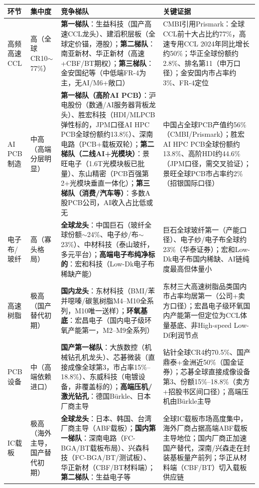 \begin{exhibitbox}[图表4-6：各环节竞争梯队与集中度]
\footnotesize
\begin{tabularx}{\textwidth}{L{2.0cm}L{1.5cm}X L{3.5cm}}
\toprule
\textbf{环节} & \textbf{集中度} & \textbf{竞争梯队} & \textbf{关键证据} \\
\midrule
高频高速CCL & 高（全球CR10$\sim$77\%） & \textbf{第一梯队}：生益科技（国产高速CCL龙头）、建滔积层板（全球定价锚，港股）；\textbf{第二梯队}：南亚新材、华正新材（高速+CBF/BT期权）；\textbf{第三梯队}：金安国纪等（中低端FR-4为主，无AI/M6+敞口） & CMBI引用Prismark：全球CCL前十大占比约77\%，高速专用CCL 2024年同比增长约50\%；华正全球份额约2.8\%、排名第11（申万口径）；金安国内市占率约3\%、FR-4定位 \\
\midrule
AI PCB制造 & 中高（高端分层明显） & \textbf{第一梯队（高阶AI PCB）}：沪电股份（数通/AI服务器背板龙头）、胜宏科技（HDI/MLPCB弹性标的，JPM口径AI HPC PCB全球份额约13.8\%）、深南电路（PCB+载板双轮）；\textbf{第二梯队（二线AI+光模块）}：景旺电子（1.6T光模块板已批量）、东山精密（PCB百强第2+光模块垂直一体化）；\textbf{第三梯队（消费/汽车等）}：多数A股PCB公司，AI收入占比低或无 & 中国占全球PCB产值约56\%（CMBI/Prismark）；胜宏AI HPC PCB全球份额约13.8\%、高阶HDI约44.6\%（JPM口径，需交叉验证）；景旺全球PCB市占率约2\%（招银国际口径） \\
\midrule
电子布/玻纤 & 高（寡头格局） & \textbf{全球龙头}：中国巨石（玻纤全球份额$\sim$24\%、电子纱/布$\sim$23\%）、中材科技（泰山玻纤，多元平台）；\textbf{高端电子布纯净标的}：宏和科技（Low-Dk电子布稀缺产能） & 巨石全球玻纤第一（产能口径）、电子纱/电子布全球约23\%（华泰证券）；宏和Low-Dk电子布国内稀缺、AI链纯度最高但体量小 \\
\midrule
高速树脂 & 极高（国产替代初期） & \textbf{国内龙头}：东材科技（BMI/苯并噁嗪/碳氢树脂M4--M10全系列，M10唯一送样）；\textbf{环氧基底}：宏昌电子（国内电子级环氧产能第一，M2--M9全系列） & 东材三大高速树脂品类国内市占率均居第一（公司+卖方口径）；宏昌电子级环氧国内产能第一但定位为CCL体量基底、非High-speed Low-Df利润节点 \\
\midrule
PCB设备 & 中（高端依赖进口） & \textbf{国产第一梯队}：大族数控（机械钻孔机龙头）、芯碁微装（直接成像全球第3，市占率15\%--18.8\%）、东威科技（电镀设备，非覆盖标的）；\textbf{高端压机/激光钻孔}：德国Bürkle、日本厂商主导 & 钻针全球CR4约70.5\%、国产鼎泰+金洲近50\%（国金证券）；芯碁全球直接成像设备第3、份额15\%--18.8\%（卖方+招股书区间口径）；高端压机由Bürkle主导 \\
\midrule
IC载板 & 极高（海外主导，国产替代初期） & \textbf{全球龙头}：日本、韩国、台湾厂商主导（ABF载板）；\textbf{国内第一梯队}：深南电路（FC-BGA/BT载板布局）、兴森科技（FC-BGA/BT/测试板）、华正新材（CBF/BT材料端）；\textbf{第二梯队}：生益电子等 & 全球IC载板市场高度集中，海外厂商占据高端ABF载板主导地位；国内厂商正加速国产替代，深南/兴森走在封装基板量产前列；华正从材料端（CBF/BT）切入载板供应链 \\

\end{tabularx}
\end{exhibitbox}
